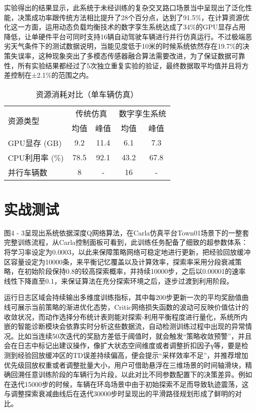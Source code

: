 实验得出的结果显示，此系统于未经训练的复杂交叉路口场景当中呈现出了泛化性能，决策成功率跟传统方法相比提升了28个百分点，达到了91.5\%，在计算资源优化这一方面，运用动态负载均衡技术的数字孪生系统达成了34\%的GPU显存占用降低，让单硬件平台可同时支持16辆自动驾驶车辆进行并行仿真运行。不过极端恶劣天气条件下的测试数据说明，当能见度低于10米的时候系统依然存在19.7\%的决策失误率，这种现象突出了多模态传感器融合算法需要改进，为了保证数据可靠性，所有实验结果都经过了5次独立重复实验的验证，最终数据取平均值并且将方差控制在±2.1\%的范围之内。

\begin{table}[htbp]
	\centering
	\caption{资源消耗对比（单车辆仿真）}
	\label{tab:resource_usage}
	\begin{tabular}{lcccc}
		\toprule
		\multirow{2}{*}{资源类型} & \multicolumn{2}{c}{传统仿真} & \multicolumn{2}{c}{数字孪生系统} \\
		\cmidrule(lr){2-3} \cmidrule(lr){4-5}
		& 均值 & 峰值 & 均值 & 峰值 \\ 
		\midrule
		GPU显存 (GB) & 9.2 & 11.4 & 6.1 & 7.3 \\
		CPU利用率 (\%) & 78.5 & 92.1 & 43.2 & 67.8 \\
		并行车辆数 & 8 & - & 16 & - \\
		\bottomrule
	\end{tabular}
\end{table}
\section{实战测试}

图4 - 3呈现出系统依据深度Q网络算法，在Carla仿真平台Town01场景下的一整套完整训练流程，从Carla控制面板可看到，此训练任务配备了细致的超参数体系：将学习率设定为0.0003，以此来保障策略网络可稳定地进行更新，把经验回放缓冲区容量设定为10000条，来平衡记忆覆盖以及计算效率，探索率采用分段衰减策略，在初始阶段保持0.8的较高探索概率，并持续10000步，之后以0.00001的速率线性下降直至0.1，来保证算法在充分探索环境之后，逐步过渡到利用阶段。

运行日志区域会持续输出多维度训练指标，其中每200步更新一次的平均奖励值曲线可展示当前策略的渐进优化态势，Critic网络损失函数的波动可反映价值估计的收敛状况，而动作选择分布统计表则能对探索-利用平衡程度进行量化，系统所内嵌的智能诊断模块会依靠实时分析这些数据流，自动检测训练过程中出现的异常情况。比如当连续50次迭代的奖励方差低于阈值时，就会触发“策略收敛预警”，并且会在日志中标记出建议操作，像扩大状态空间维度或者调整折扣因子γ等，要是检测到经验回放缓冲区的TD误差持续偏高，便会提示“采样效率不足”，并推荐增加优先级回放权重或者调整批量大小，用户可借助悬浮在三维场景的时间轴滑块，精确回溯任意训练阶段的车辆行为片段，以此对比不同参数配置下的决策差异。例如在迭代15000步的时候，车辆在环岛场景中由于初始探索不足而导致轨迹震荡，这与调整探索衰减曲线后在迭代30000步时呈现出的平滑路径规划形成了鲜明的对比。

